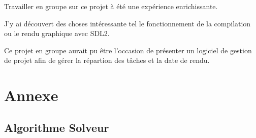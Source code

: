 \documentclass[12pt]{article}
\begin{document}
Travailler en groupe sur ce projet à été une expérience enrichissante.

J'y ai découvert des choses intéressante tel le fonctionnement de la compilation ou le rendu graphique avec SDL2.

Ce projet en groupe aurait pu être l'occasion de présenter un logiciel de gestion de projet afin de gérer la répartion des tâches et la date de rendu.






\section{Annexe}
\subsection{Algorithme Solveur}
\label{algosolv}

\end{document}
